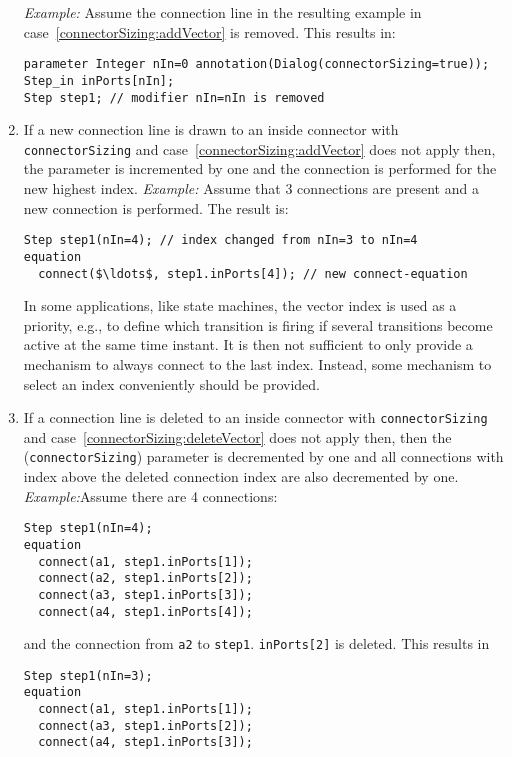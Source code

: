 \begin{nonnormative}
\begin{enumerate}
  \emph{Example:} Assume the connection line in the resulting example in case~\ref{connectorSizing:addVector} is removed.
  This results in:
\begin{lstlisting}[language=modelica]
parameter Integer nIn=0 annotation(Dialog(connectorSizing=true));
Step_in inPorts[nIn];
Step step1; // modifier nIn=nIn is removed
\end{lstlisting}
\item \label{connectorSizing:addScalar}
  If a new connection line is drawn to an inside connector with \lstinline!connectorSizing! and case~\ref{connectorSizing:addVector} does not apply then, the parameter is incremented by one and the connection is performed for the new highest index.
  \emph{Example:} Assume that 3 connections are present and a new connection is performed.
  The result is:
\begin{lstlisting}[language=modelica]
  Step step1(nIn=4); // index changed from nIn=3 to nIn=4
equation
  connect($\ldots$, step1.inPorts[4]); // new connect-equation
\end{lstlisting}
  In some applications, like state machines, the vector index is used as a priority, e.g., to define which transition is firing if several transitions become active at the same time instant.
  It is then not sufficient to only provide a mechanism to always connect to the last index.
  Instead, some mechanism to select an index conveniently should be provided.
\item \label{connectorSizing:deleteScalar}
  If a connection line is deleted to an inside connector with \lstinline!connectorSizing! and case~\ref{connectorSizing:deleteVector} does not apply then, then the (\lstinline!connectorSizing!) parameter is decremented by one and all connections with index above the deleted connection index are also decremented by one.
  \emph{Example:}Assume there are 4 connections:
\begin{lstlisting}[language=modelica]
  Step step1(nIn=4);
equation
  connect(a1, step1.inPorts[1]);
  connect(a2, step1.inPorts[2]);
  connect(a3, step1.inPorts[3]);
  connect(a4, step1.inPorts[4]);
\end{lstlisting}
  and the connection from \lstinline!a2! to \lstinline!step1!.
  \lstinline!inPorts[2]! is deleted.
  This results in
\begin{lstlisting}[language=modelica]
  Step step1(nIn=3);
equation
  connect(a1, step1.inPorts[1]);
  connect(a3, step1.inPorts[2]);
  connect(a4, step1.inPorts[3]);
\end{lstlisting}
\end{enumerate}


\end{nonnormative}
